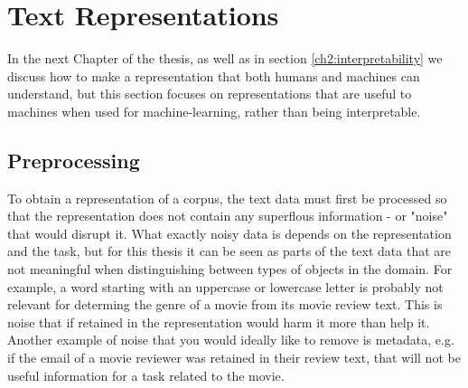 
















\section{Text Representations}\label{ch2:representations}




In the next Chapter of the thesis, as well as in section \ref{ch2:interpretability} we discuss how to make a representation that both humans and machines can understand, but this section  focuses on representations that are useful to machines when used for machine-learning, rather than being interpretable.


\subsection{Preprocessing}\label{ch2:data}

To obtain a representation of a corpus, the text data must first be processed so that the representation does not contain any superflous information - or "noise" that would disrupt it. What exactly noisy data is depends on the representation and the task, but for this thesis it can be seen as parts of the text data that are not meaningful when distinguishing between types of objects in the domain. For example,  a word starting with an uppercase or lowercase letter is probably not relevant for determing the genre of a movie from  its movie review text. This is noise that if retained in the representation would harm it more than help it. Another example of noise that you would ideally like to remove is metadata, e.g. if the email of a movie reviewer was retained in their review text, that will not be useful information for a task related to the movie.

